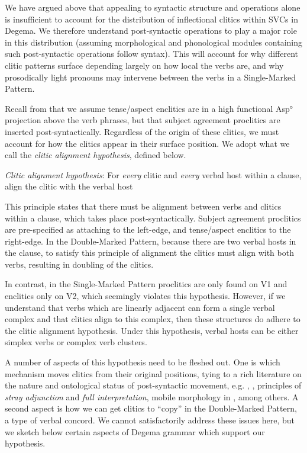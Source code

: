 \documentclass[output=paper]{langsci/langscibook}
\begin{document}
We have argued above that appealing to syntactic structure and operations alone is insufficient to account for the distribution of inflectional clitics within SVCs in Degema. We therefore understand post-syntactic operations to play a major role in this distribution (assuming morphological and phonological modules containing such post-syntactic operations follow syntax). This will account for why different clitic patterns surface depending largely on how local the verbs are, and why prosodically light pronouns may intervene between the verbs in a Single-Marked Pattern. 

Recall from  that we assume tense/aspect enclitics are in a high functional Asp° projection above the verb phrases, but that subject agreement proclitics are inserted post-syntactically. Regardless of the origin of these clitics, we must account for how the clitics appear in their surface position. We adopt what we call the \textit{clitic alignment hypothesis}, defined below. 


\ea\label{ex:rolle:47}
{\textit{Clitic alignment hypothesis}: For \textit{every} clitic and \textit{every} verbal host within a clause, align the clitic with the verbal host}
\z

This principle states that there must be alignment between verbs and clitics within a clause, which takes place post-syntactically. Subject agreement proclitics are pre-specified as attaching to the left-edge, and tense/aspect enclitics to the right-edge. In the Double-Marked Pattern, because there are two verbal hosts in the clause, to satisfy this principle of alignment the clitics must align with both verbs, resulting in doubling of the clitics. 

In contrast, in the Single-Marked Pattern proclitics are only found on V1 and enclitics only on V2, which seemingly violates this hypothesis. However, if we understand that verbs which are linearly adjacent can form a single verbal complex and that clitics align to this complex, then these structures do adhere to the clitic alignment hypothesis. Under this hypothesis, verbal hosts can be either simplex verbs or complex verb clusters.

A number of aspects of this hypothesis need to be fleshed out. One is which mechanism moves clitics from their original positions, tying to a rich literature on the nature and ontological status of post-syntactic movement, e.g. \citet{NesporVogel1986}, \citet{Bošković2001},  principles of \textit{stray adjunction} and\textit{ full interpretation}, mobile morphology in \citet{JenksRose2015}, among others. A second aspect is how we can get clitics to “copy” in the Double-Marked Pattern, a type of verbal concord. We cannot satisfactorily address these issues here, but we sketch below certain aspects of Degema grammar which support our hypothesis. 
\end{document}
